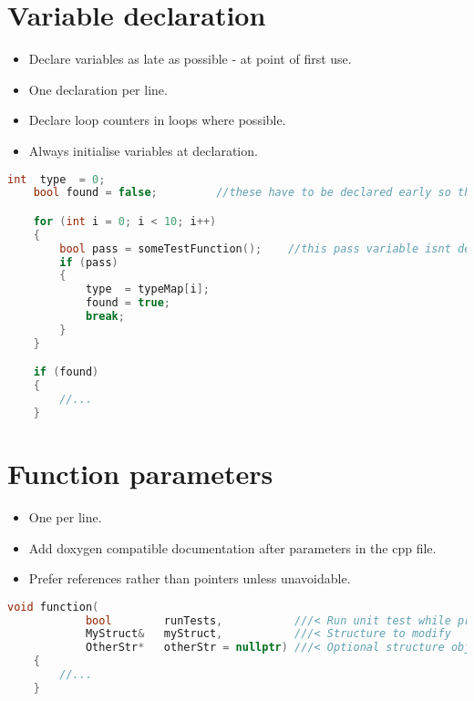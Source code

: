 \section{Variable declaration}

\begin{itemize}
\item Declare variables as late as possible - at point of first use.
\item One declaration per line.
\item Declare loop counters in loops where possible.
\item Always initialise variables at declaration.
\end{itemize}

\begin{lstlisting}[language=c++]
    int  type  = 0;
    bool found = false;         //these have to be declared early so they can be used after the for loop

    for (int i = 0; i < 10; i++)
    {
        bool pass = someTestFunction();    //this pass variable isnt declared until it's used - good
        if (pass)
        {
            type  = typeMap[i];
            found = true;
            break;
        }
    }

    if (found)
    {
        //...
    }    
\end{lstlisting}

\section{Function parameters}

\begin{itemize}
\item One per line.
\item Add doxygen compatible documentation after parameters in the cpp file.
\item Prefer references rather than pointers unless unavoidable.
\end{itemize}

\begin{lstlisting}[language=c++]
    void function(
            bool        runTests,           ///< Run unit test while processing
            MyStruct&   myStruct,           ///< Structure to modify
            OtherStr*	otherStr = nullptr)	///< Optional structure object to populate (cant use reference because its optional)
    {
    	//...
    }
\end{lstlisting}

